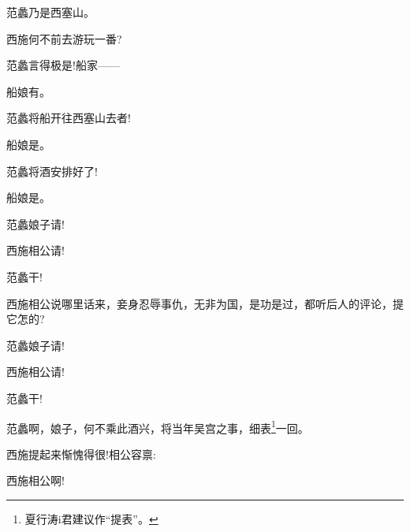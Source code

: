 {范蠡\hspace{30pt}乃是西塞山。

西施\hspace{30pt}何不前去游玩一番?

范蠡\hspace{30pt}言得极是!船家------

船娘\hspace{30pt}有。

范蠡\hspace{30pt}将船开往西塞山去者!

船娘\hspace{30pt}是。

范蠡\hspace{30pt}将酒安排好了!

船娘\hspace{30pt}是。

范蠡\hspace{30pt}娘子请!

西施\hspace{30pt}相公请!

范蠡\hspace{30pt}干!


西施\hspace{30pt}相公说哪里话来，妾身忍辱事仇，无非为国，是功是过，都听后人的评论，提它怎的?

范蠡\hspace{30pt}娘子请!

西施\hspace{30pt}相公请!

范蠡\hspace{30pt}干!

范蠡\hspace{30pt}啊，娘子，何不乘此酒兴，将当年吴宫之事，细表\footnote{ 夏行涛i{\scriptsize 君}建议作``提表''。}一回。

西施\hspace{30pt}提起来惭愧得很!相公容禀: 


西施\hspace{30pt}相公啊!

}
